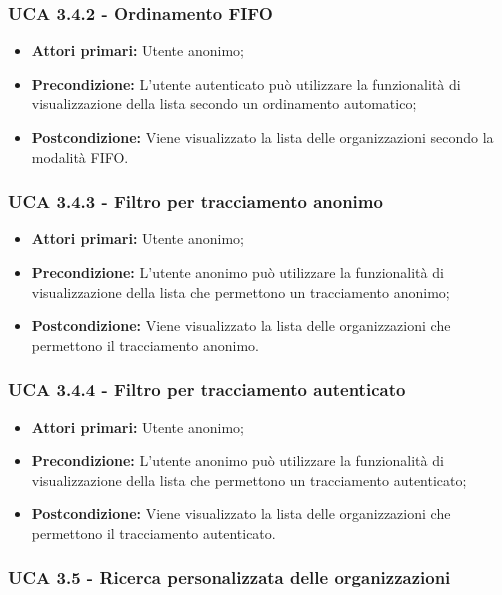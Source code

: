 \subsubsection{UCA 3.4.2 - Ordinamento FIFO}%
\begin{itemize}	
	\item \textbf{Attori primari:} Utente anonimo;
	\item \textbf{Precondizione:} L'utente autenticato può utilizzare la funzionalità di visualizzazione della lista secondo un ordinamento automatico;
	\item \textbf{Postcondizione:} Viene visualizzato la lista delle organizzazioni secondo la modalità FIFO.
\end{itemize}

\subsubsection{UCA 3.4.3 - Filtro per tracciamento anonimo}%
\begin{itemize}
	\item \textbf{Attori primari:} Utente anonimo;
	\item \textbf{Precondizione:} L'utente anonimo può utilizzare la funzionalità di visualizzazione della lista che permettono un tracciamento anonimo;
	\item \textbf{Postcondizione:} Viene visualizzato la lista delle organizzazioni che permettono il tracciamento anonimo.
\end{itemize}

\subsubsection{UCA 3.4.4 - Filtro per tracciamento autenticato}%
\begin{itemize}
	\item \textbf{Attori primari:} Utente anonimo;
	\item \textbf{Precondizione:} L'utente anonimo può utilizzare la funzionalità di visualizzazione della lista che permettono un tracciamento autenticato;
	\item \textbf{Postcondizione:} Viene visualizzato la lista delle organizzazioni che permettono il tracciamento autenticato.
\end{itemize}



\subsubsection{UCA 3.5 - Ricerca personalizzata delle organizzazioni}%

